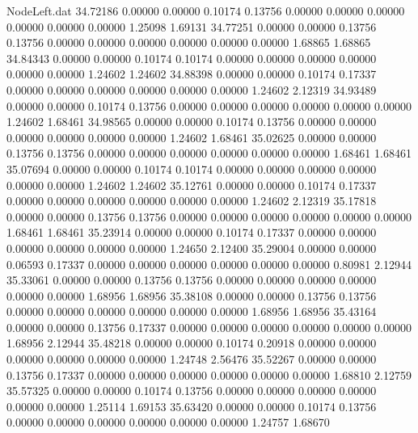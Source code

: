 \begin{filecontents}{NodeLeft.dat}
  34.72186    0.00000    0.00000     0.10174    0.13756    0.00000    0.00000    0.00000    0.00000    0.00000    0.00000    1.25098    1.69131
  34.77251    0.00000    0.00000     0.13756    0.13756    0.00000    0.00000    0.00000    0.00000    0.00000    0.00000    1.68865    1.68865
  34.84343    0.00000    0.00000     0.10174    0.10174    0.00000    0.00000    0.00000    0.00000    0.00000    0.00000    1.24602    1.24602
  34.88398    0.00000    0.00000     0.10174    0.17337    0.00000    0.00000    0.00000    0.00000    0.00000    0.00000    1.24602    2.12319
  34.93489    0.00000    0.00000     0.10174    0.13756    0.00000    0.00000    0.00000    0.00000    0.00000    0.00000    1.24602    1.68461
  34.98565    0.00000    0.00000     0.10174    0.13756    0.00000    0.00000    0.00000    0.00000    0.00000    0.00000    1.24602    1.68461
  35.02625    0.00000    0.00000     0.13756    0.13756    0.00000    0.00000    0.00000    0.00000    0.00000    0.00000    1.68461    1.68461
  35.07694    0.00000    0.00000     0.10174    0.10174    0.00000    0.00000    0.00000    0.00000    0.00000    0.00000    1.24602    1.24602
  35.12761    0.00000    0.00000     0.10174    0.17337    0.00000    0.00000    0.00000    0.00000    0.00000    0.00000    1.24602    2.12319
  35.17818    0.00000    0.00000     0.13756    0.13756    0.00000    0.00000    0.00000    0.00000    0.00000    0.00000    1.68461    1.68461
  35.23914    0.00000    0.00000     0.10174    0.17337    0.00000    0.00000    0.00000    0.00000    0.00000    0.00000    1.24650    2.12400
  35.29004    0.00000    0.00000     0.06593    0.17337    0.00000    0.00000    0.00000    0.00000    0.00000    0.00000    0.80981    2.12944
  35.33061    0.00000    0.00000     0.13756    0.13756    0.00000    0.00000    0.00000    0.00000    0.00000    0.00000    1.68956    1.68956
  35.38108    0.00000    0.00000     0.13756    0.13756    0.00000    0.00000    0.00000    0.00000    0.00000    0.00000    1.68956    1.68956
  35.43164    0.00000    0.00000     0.13756    0.17337    0.00000    0.00000    0.00000    0.00000    0.00000    0.00000    1.68956    2.12944
  35.48218    0.00000    0.00000     0.10174    0.20918    0.00000    0.00000    0.00000    0.00000    0.00000    0.00000    1.24748    2.56476
  35.52267    0.00000    0.00000     0.13756    0.17337    0.00000    0.00000    0.00000    0.00000    0.00000    0.00000    1.68810    2.12759
  35.57325    0.00000    0.00000     0.10174    0.13756    0.00000    0.00000    0.00000    0.00000    0.00000    0.00000    1.25114    1.69153
  35.63420    0.00000    0.00000     0.10174    0.13756    0.00000    0.00000    0.00000    0.00000    0.00000    0.00000    1.24757    1.68670

\end{filecontents}
